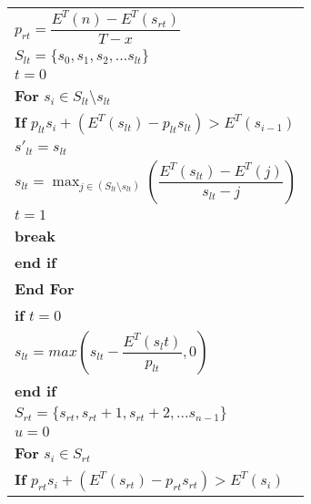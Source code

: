\begin{table}
\begin{minipage}[b]{8cm}
\begin{tabular}{p{7cm}}
\\
\hspace{4mm}$p_{rt} = \dfrac{E^T(n)-E^T(s_{rt})}{T-x}$
\\
\hspace{4mm}$S_{lt} = \{s_0,s_1,s_2,...s_{lt}\}$
\\
\hspace{4mm}$t=0$
\\
\hspace{4mm}\textbf{For} $s_i \in S_{lt}\setminus s_{lt}$
\\
\hspace{7mm}\textbf{If} $p_{lt}s_i + (E^T(s_{lt}) - p_{lt}s_{lt}) > E^T(s_{i-1})$
\\
\hspace{10mm}$s'_{lt} = s_{lt}$
\\
\hspace{10mm}$s_{lt} = \displaystyle \max_{j\in(S_{lt}\setminus {s_{lt}})}(\dfrac{E^T(s_{lt}) - E^T(j)}{s_{lt}-j})$
\\
\hspace{10mm}$t=1$
\\
\hspace{10mm}\textbf{break}
\\
\hspace{7mm}\textbf{end if}
\\
\hspace{4mm}\textbf{End For}
\\
\hspace{4mm}\textbf{if} $t=0$
\\
\hspace{7mm}$s_{lt} = max(s_{lt} - \dfrac{E^T(s_lt)}{p_{lt}} , 0)$
\\
\hspace{4mm}\textbf{end if}
\\
\hspace{4mm}$S_{rt} = \{s_{rt},s_{rt}+1,s_{rt}+2,...s_{n-1}\}$
\\
\hspace{4mm}$u=0$
\\
\hspace{4mm}\textbf{For} $s_i \in S_{rt}$
\\
\hspace{7mm}\textbf{If} $p_{rt}s_i + (E^T(s_{rt}) - p_{rt}s_{rt}) > E^T(s_i)$

\end{tabular}
\end{minipage}
\end{table}
